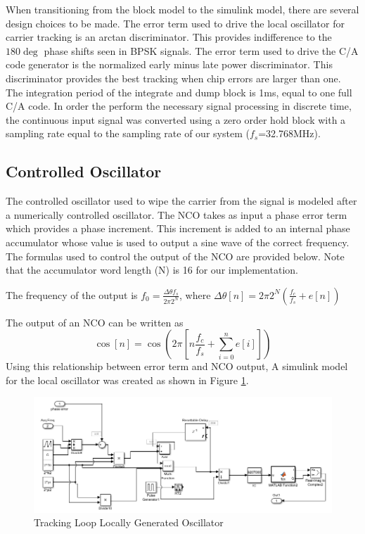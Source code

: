 \documentclass[11pt]{article}
\numberwithin{equation}{subsection}
\begin{document}
	
	When transitioning from the block model to the simulink model, there are several design choices to be made. The error term used to drive the local oscillator for carrier tracking is an arctan discriminator. This provides indifference to the $180\deg$ phase shifts seen in BPSK signals. The error term used to drive the C/A code generator is the normalized early minus late power discriminator. This discriminator provides the best tracking when chip errors are larger than one. The integration period of the integrate and dump block is 1ms, equal to one full C/A code. In order the perform the necessary signal processing in discrete time, the continuous input signal was converted using a zero order hold block with a sampling rate equal to the sampling rate of our system ($f_{s}$=32.768MHz).
	\subsection{Controlled Oscillator}
	The controlled oscillator used to wipe the carrier from the signal is modeled after a numerically controlled oscillator. The NCO takes as input a phase error term which provides a phase increment. This increment is added to an internal phase accumulator whose value is used to output a sine wave of the correct frequency. The formulas used to control the output of the NCO are provided below. Note that the accumulator word length (N) is 16 for our implementation.
	
	The frequency of the output is $f_{0}=\frac{\Delta\theta f_{s}}{2\pi 2^{N}}$, 	
	where $\Delta\theta[n]=2\pi 2^{N}(\frac{f_{c}}{f_{s}}+e[n])$
	
	The output of an NCO can be written as \begin{equation}\cos[n] = \cos(2\pi[n\frac{f_{c}}{f_{s}}+\sum\limits_{i=0}^n e[i] ])
	\end{equation}
	Using this relationship between error term and NCO output, A simulink model for the local oscillator was created as shown in Figure \ref{NCO}.
	\begin{figure}
		\centering
		\includegraphics[width=\textwidth]{NCO}
		
		\caption{Tracking Loop Locally Generated Oscillator}
		\label{NCO}
	\end{figure}
	
\end{document}
